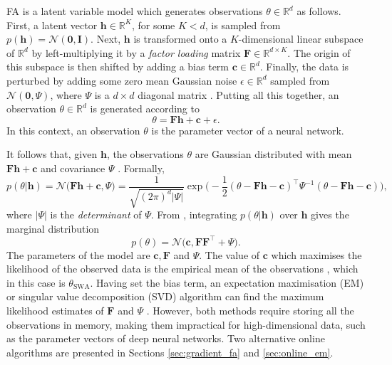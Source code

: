 \documentclass[msc,deptreport.inf]{infthesis} %
\newcommand{\matr}[1]{\mathbf{#1}}
\newcommand{\R}{\mathbb R}
\begin{document}
FA is a latent variable model which generates observations $\theta \in \R^d$ as follows. First, a latent vector $\matr{h} \in \R^K$, for some $K < d$, is sampled from $p(\matr{h}) = \mathcal{N}(\matr{0}, \matr{I})$. Next, $\matr{h}$ is transformed onto a $K$-dimensional linear subspace of $\R^d$ by left-multiplying it by a \emph{factor loading} matrix $\matr{F} \in \R^{d \times K}$. The origin of this subspace is then shifted by adding a bias term $\matr{c} \in \R^d$. Finally, the data is perturbed by adding some zero mean Gaussian noise $\epsilon \in \R^d$ sampled from $\mathcal{N}(\matr{0}, \Psi)$, where $\Psi$ is a $d\times d$ diagonal matrix \cite{barber2007}. Putting all this together, an observation $\theta \in \R^d$ is generated according to 
\begin{equation}\label{eqn:fa_model}
	\theta = \matr{Fh} + \matr{c} + \epsilon.
\end{equation}
In this context, an observation $\theta$ is the parameter vector of a neural network. 

It follows that, given $\matr{h}$, the observations $\theta$ are Gaussian distributed with mean $\matr{Fh} + \matr{c}$ and covariance $\Psi$ \cite{barber2007}. Formally,
\begin{equation}\label{eqn:fa_cond_dist}
	p(\theta | \matr{h}) 
	= \mathcal{N}\Big( \matr{Fh} + \matr{c}, \Psi \Big)
	= \frac{1}{\sqrt{(2\pi)^d |\Psi|}} 
	\exp \Big(-\frac{1}{2} (\theta - \matr{Fh} - \matr{c})^\intercal \Psi^{-1} (\theta - \matr{Fh} 	- \matr{c})\Big),
\end{equation}
where $|\Psi|$ is the \emph{determinant} of $\Psi$. From \cite{barber2007}, integrating $p(\theta | \matr{h})$ over $\matr{h}$ gives the marginal distribution
\begin{equation}\label{eqn:fa_marginal_dist}
	p(\theta) = \mathcal{N}\big(\matr{c}, \matr{FF}^{\intercal} + \Psi\big).
\end{equation}
The parameters of the model are $\matr{c}, \matr{F}$ and $\Psi$. The value of $\matr{c}$ which maximises the likelihood of the observed data is the empirical mean of the observations \cite{barber2007}, which in this case is $\theta_{\text{SWA}}$. 
Having set the bias term, an expectation maximisation (EM) or singular value decomposition (SVD) algorithm can find the maximum likelihood estimates of $\matr{F}$ and $\Psi$ \cite{barber2007}. However, both methods require storing all the observations in memory, making them impractical for high-dimensional data, such as the parameter vectors of deep neural networks. Two alternative online algorithms are presented in Sections \ref{sec:gradient_fa} and \ref{sec:online_em}.
\end{document}

